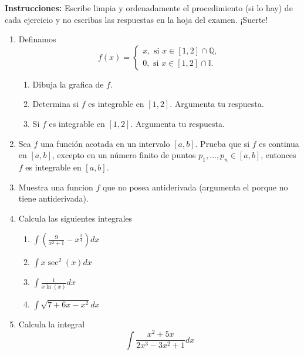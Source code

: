 \documentclass[12pt,oneside,spanish]{amsbook}
\theoremstyle{plain}
\theoremstyle{definition}
\theoremstyle{remark}
\begin{document}
    \textbf{Instrucciones:} Escribe limpia y ordenadamente el procedimiento
    (si lo hay) de cada ejercicio y no escribas las respuestas en la hoja
    del examen. ¡Suerte! 
    \begin{enumerate}
        \item Definamos
        \begin{equation*}
            f(x)=
            \begin{cases*}
                x,\text{ si }x\in[1,2]\cap\mathbb{Q},\\
                0,\text{ si }x\in[1,2]\cap\mathbb{I}.
            \end{cases*}
        \end{equation*}
        \begin{enumerate}
            \item[(a)] Dibuja la grafica de $f$.
            \item[(b)] Determina si $f$ es integrable en $[1,2]$. Argumenta tu respuesta.
            \item[(c)] Si $f$ es integrable en $[1,2]$. Argumenta tu respuesta. 
        \end{enumerate}
        \item Sea $f$ una función acotada en un intervalo $[a,b]$. Prueba que si $f$
        es continua en $[a,b]$, excepto en un número finito de puntos $p_{1},\dots,p_{n}\in[a,b]$,
        entonces $f$ es integrable en $[a,b]$.
        \item Muestra una funcion $f$ que no posea antiderivada (argumenta el porque no tiene
        antiderivada).
        \item Calcula las siguientes integrales
        \begin{enumerate}
            \item[(a)] $\displaystyle\int\left(\frac{9}{x^{2}+1}-x^{\frac{3}{4}}\right)dx$
            \item[(b)] $\displaystyle\int x\sec^{2}(x)dx$
            \item[(c)] $\displaystyle\int\frac{1}{x\ln(x)}dx$
            \item[(d)] $\displaystyle\int\sqrt{7+6x-x^{2}}dx$ 
        \end{enumerate}
        \item Calcula la integral
        \begin{equation*}
            \int\frac{x^{2}+5x}{2x^{3}-3x^{2}+1}dx
        \end{equation*}
    \end{enumerate}
\end{document}
